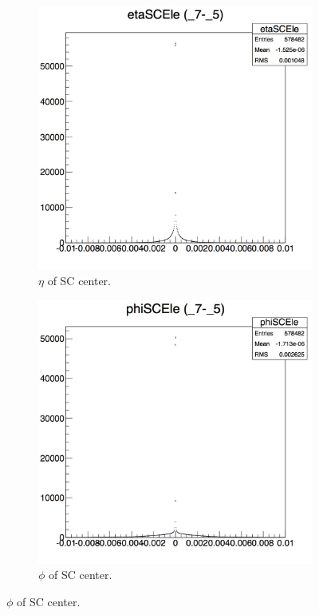 \documentclass[10pt]{article}
\begin{document}
\begin{figure}[h!]
\begin{subfigure}[b]{0.22\textwidth}
        \end{subfigure}
        ~ %
        \begin{subfigure}[b]{0.22\textwidth}
                \includegraphics[width=\textwidth]{Plots/etaSC}
                \caption{$\eta$ of SC center.}
            
        \end{subfigure}
         \begin{subfigure}[b]{0.22\textwidth}
                \includegraphics[width=\textwidth]{Plots/phiSC}
                \caption{$\phi$ of SC center.}
             

\end{subfigure}
\end{figure}
\end{document}
